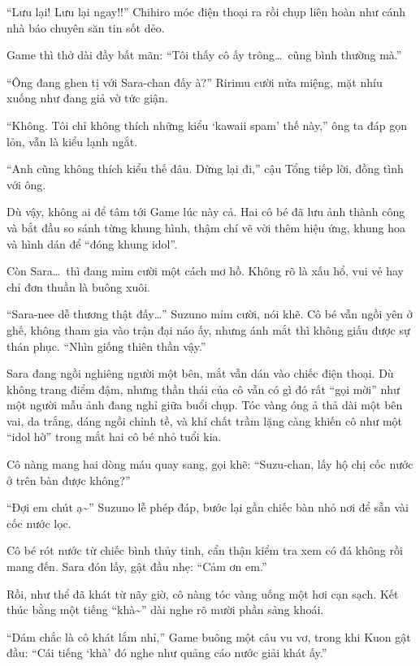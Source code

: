 \documentclass[../main.tex]{subfiles}
\begin{document}
``Lưu lại! Lưu lại ngay!!'' Chihiro móc điện thoại ra rồi chụp liên hoàn như cánh nhà báo chuyên săn tin sốt dẻo.

Game thì thở dài đầy bất mãn: ``Tôi thấy cô ấy trông\dots\ cũng bình thường mà.''

``Ông đang ghen tị với Sara-chan đấy à?'' Ririmu cười nửa miệng, mặt nhíu xuống như đang giả vờ tức giận.

``Không. Tôi chỉ không thích những kiểu `kawaii spam' thế này,'' ông ta đáp gọn lỏn, vẫn là kiểu lạnh ngắt.

``Anh cũng không thích kiểu thế đâu. Dừng lại đi,'' cậu Tổng tiếp lời, đồng tình với ông.

Dù vậy, không ai để tâm tới Game lúc này cả. Hai cô bé đã lưu ảnh thành công và bắt đầu so sánh từng khung hình, thậm chí vẽ vời thêm hiệu ứng, khung hoa và hình dán để ``đóng khung idol''.


Còn Sara\dots\ thì đang mỉm cười một cách mơ hồ. Không rõ là xấu hổ, vui vẻ hay chỉ đơn thuần là buông xuôi.

``Sara-nee dễ thương thật đấy\dots'' Suzuno mỉm cười, nói khẽ. Cô bé vẫn ngồi yên ở ghế, không tham gia vào trận đại náo ấy, nhưng ánh mắt thì không giấu được sự thán phục. ``Nhìn giống thiên thần vậy.''

\ct

Sara đang ngồi nghiêng người một bên, mắt vẫn dán vào chiếc điện thoại. Dù không trang điểm đậm, nhưng thần thái của cô vẫn có gì đó rất ``gọi mời'' như một người mẫu ảnh đang nghỉ giữa buổi chụp. Tóc vàng óng ả thả dài một bên vai, da trắng, dáng ngồi chỉnh tề, và khí chất trầm lặng càng khiến cô như một ``idol hờ'' trong mắt hai cô bé nhỏ tuổi kia.

Cô nàng mang hai dòng máu quay sang, gọi khẽ: ``Suzu-chan, lấy hộ chị cốc nước ở trên bàn được không?''

``Đợi em chút ạ\~{}'' Suzuno lễ phép đáp, bước lại gần chiếc bàn nhỏ nơi để sẵn vài cốc nước lọc.

Cô bé rót nước từ chiếc bình thủy tinh, cẩn thận kiểm tra xem có đá không rồi mang đến. Sara đón lấy, gật đầu nhẹ: ``Cảm ơn em.''

Rồi, như thể đã khát từ nãy giờ, cô nàng tóc vàng uống một hơi cạn sạch. Kết thúc bằng một tiếng ``khà\~{}'' dài nghe rõ mười phần sảng khoái.


``Dám chắc là cô khát lắm nhỉ,'' Game buông một câu vu vơ, trong khi Kuon gật đầu: ``Cái tiếng `khà' đó nghe như quảng cáo nước giải khát ấy.''
\end{document}
